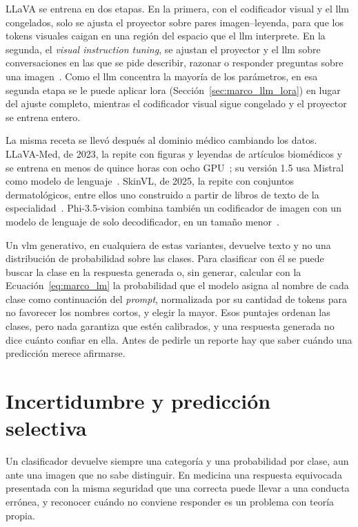 LLaVA se entrena en dos etapas. En la primera, con el codificador visual y el \gls{llm} congelados, solo se
ajusta el proyector sobre pares imagen--leyenda, para que los tokens visuales caigan en una región del
espacio que el \gls{llm} interprete. En la segunda, el \emph{visual instruction tuning}, se ajustan el
proyector y el \gls{llm} sobre conversaciones en las que se pide describir, razonar o responder preguntas
sobre una imagen~\cite{liu2023visual}. Como el \gls{llm} concentra la mayoría de los parámetros, en esa
segunda etapa se le puede aplicar \gls{lora} (Sección~\ref{sec:marco_llm_lora}) en lugar del ajuste completo,
mientras el codificador visual sigue congelado y el proyector se entrena entero.



La misma receta se llevó después al dominio médico cambiando los datos. LLaVA-Med, de 2023, la repite con
figuras y leyendas de artículos biomédicos y se entrena en menos de quince horas con ocho
GPU~\cite{li2023llavamed}; su versión 1.5 usa Mistral como modelo de lenguaje~\cite{zeng2025mmskin}. SkinVL, de 2025, la repite con
conjuntos dermatológicos, entre ellos uno construido a partir de libros de texto de la
especialidad~\cite{zeng2025mmskin}. Phi-3.5-vision combina también un codificador de imagen con un modelo de
lenguaje de solo decodificador, en un tamaño menor~\cite{abdin2024phi3}.

Un \gls{vlm} generativo, en cualquiera de estas variantes, devuelve texto y no una distribución de probabilidad
sobre las clases. Para clasificar con él se puede buscar la clase en la respuesta generada o, sin generar,
calcular con la Ecuación~\ref{eq:marco_lm} la probabilidad que el modelo asigna al nombre de cada clase como
continuación del \emph{prompt}, normalizada por su cantidad de tokens para no favorecer los nombres cortos, y
elegir la mayor. Esos puntajes ordenan las clases, pero nada garantiza que estén
calibrados, y una respuesta generada no dice cuánto confiar en ella. Antes de pedirle un reporte hay que saber
cuándo una predicción merece afirmarse.

\section{Incertidumbre y predicción selectiva}
\label{sec:marco_incertidumbre}

Un clasificador devuelve siempre una categoría y una probabilidad por clase, aun ante una imagen que no sabe
distinguir. En medicina una respuesta equivocada presentada con la misma seguridad que una correcta puede
llevar a una conducta errónea, y reconocer cuándo no conviene responder es un problema con teoría propia.

